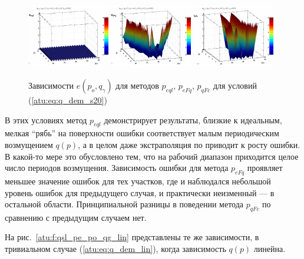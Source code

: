 \begin{figure}[htb!]
  \centerline{
    \includegraphics[width=0.32\textwidth]{p/qls_pe-p_po_qg_eql_s20.png}
    \hfill
    \includegraphics[width=0.32\textwidth]{p/qls_pe-p_po_qg_eFq_s20.png}
    \hfill
    \includegraphics[width=0.32\textwidth]{p/qls_pe-p_po_qg_eFc_s20.png}
  }
  \caption{Зависимости $e(p_o,q_\gamma)$ для методов $p_{eql}$, $p_{eFq}$, $p_{qFc}$ для условий (\ref{atu:eq:q_dem_s20})}
  \label{atu:f:qsl_pe_po_qg_s20}
\end{figure}

В этих условиях метод $p_{eql}$ демонстрирует результаты, близкие к идеальным,
мелкая ``рябь'' на поверхности ошибки соответствует малым периодическим
возмущением $q(p)$, а в целом даже экстраполяция по приводит к росту ошибки.
В какой-то мере это обусловлено тем, что на рабочий диапазон приходится целое
число периодов возмущения. Зависимость ошибки для метода
$p_{eFq}$ проявляет меньшее значение ошибок для
тех участков, где и наблюдался небольшой уровень ошибок для
предыдущего случая, и практически неизменный --- в остальной области.
Принципиальной разницы в поведении метода $p_{qFc}$
по сравнению с предыдущим случаем нет.

На рис.~\ref{atu:f:qsl_pe_po_qg_lin} представлены те же зависимости,
в тривиальном случае (\ref{atu:eq:q_dem_lin}),
когда зависимость $q(p)$ линейна.

